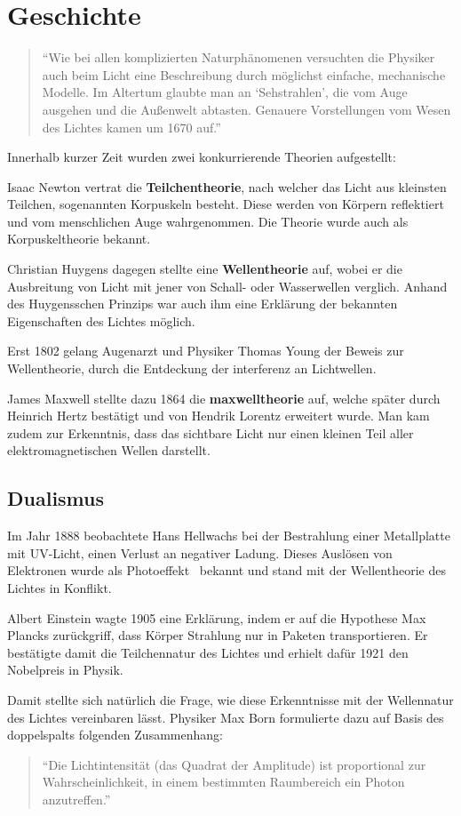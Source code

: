 \section{Geschichte}
\begin{quote}
\enquote{Wie bei allen komplizierten Naturphänomenen versuchten die Physiker auch beim Licht eine Beschreibung durch möglichst einfache, mechanische Modelle. Im Altertum glaubte man an \enquote{Sehstrahlen}, die vom Auge ausgehen und die Außenwelt abtasten. Genauere Vorstellungen vom Wesen des Lichtes kamen um 1670 auf.} \cite[S. 221]{physik1}
\end{quote}

Innerhalb kurzer Zeit wurden zwei konkurrierende Theorien aufgestellt:
\begin{outline}
	\1 Isaac Newton vertrat die \textbf{Teilchentheorie}, nach welcher das Licht aus kleinsten Teilchen, sogenannten Korpuskeln besteht. Diese werden von Körpern reflektiert und vom menschlichen Auge wahrgenommen. Die Theorie wurde auch als Korpuskeltheorie bekannt.
	
	\1 Christian Huygens dagegen stellte eine \textbf{Wellentheorie} auf, wobei er die Ausbreitung von Licht mit jener von Schall- oder Wasserwellen verglich. Anhand des Huygensschen Prinzips war auch ihm eine Erklärung der bekannten Eigenschaften des Lichtes möglich.
\end{outline}

Erst 1802 gelang Augenarzt und Physiker Thomas Young der Beweis zur Wellentheorie, durch die Entdeckung der \gls{interferenz} an Lichtwellen.

James Maxwell stellte dazu 1864 die \textbf{\gls{maxwelltheorie}} auf, welche später durch Heinrich Hertz bestätigt und von Hendrik Lorentz erweitert wurde. Man kam zudem zur Erkenntnis, dass das sichtbare Licht nur einen kleinen Teil aller elektromagnetischen Wellen darstellt.

\subsection{Dualismus}
Im Jahr 1888 beobachtete Hans Hellwachs bei der Bestrahlung einer Metallplatte mit UV-Licht, einen Verlust an negativer Ladung. Dieses Auslösen von Elektronen wurde als Photoeffekt~ %
bekannt und stand mit der Wellentheorie des Lichtes in Konflikt.

Albert Einstein wagte 1905 eine Erklärung, indem er auf die Hypothese Max Plancks zurückgriff, dass Körper Strahlung nur in Paketen transportieren. Er bestätigte damit die Teilchennatur des Lichtes und erhielt dafür 1921 den Nobelpreis in Physik.

Damit stellte sich natürlich die Frage, wie diese Erkenntnisse mit der Wellennatur des Lichtes vereinbaren lässt. Physiker Max Born formulierte dazu auf Basis des \glspl{doppelspalt} folgenden Zusammenhang:
\begin{quote}
\enquote{Die Lichtintensität (das Quadrat der Amplitude) ist proportional zur Wahrscheinlichkeit, in einem bestimmten Raumbereich ein Photon anzutreffen.} \cite[S. 183]{physik2}
\end{quote}